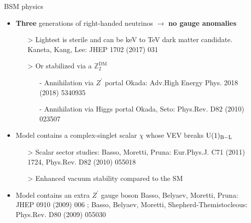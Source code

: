 \documentclass[10pt,xcolor=dvipsnames,mathserif]{beamer}
\begin{document}
\begin{frame}{BSM physics}
	
	\begin{itemize}
		\item \textbf{Three} generations of right-handed neutrinos $\to$ \textbf{\red no gauge anomalies}
		\begin{itemize}
			\item[>] Lightest is sterile and can be keV to TeV dark matter candidate. \\ {\blue \scriptsize  Kaneta, Kang, Lee: JHEP 1702 (2017) 031}
			\item[>] Or stabilized via a $\mathbb{Z}_2^{\mathrm{DM}}$
			\begin{itemize}
				\item[-] Annihilation via $Z^\prime$ portal {\scriptsize \blue Okada: Adv.High Energy Phys. 2018 (2018) 5340935}
				\item[-] Annihilation via Higgs portal {\scriptsize  \blue Okada, Seto: Phys.Rev. D82 (2010) 023507}
			\end{itemize}
		\end{itemize}
		\vskip2mm
		\item Model contains a complex-singlet scalar $\chi$ whose VEV breaks $\mathrm{U}(1)_{\mathrm{B-L}}$
		\begin{itemize}
			\item[>] Scalar sector studies: {\scriptsize  \blue Basso, Moretti, Pruna: Eur.Phys.J. C71 (2011) 1724, Phys.Rev. D82 (2010) 055018}
			\vskip2mm
			\item[>] Enhanced vacuum stability compared to the SM
			
		\end{itemize}	
		\vskip2mm
		\item Model contains an extra $Z^\prime$ gauge boson {\scriptsize  \blue Basso, Belyaev, Moretti, Pruna: JHEP 0910 (2009) 006} ; {\scriptsize  \blue Basso, Belyaev, Moretti, Shepherd-Themistocleous: Phys.Rev. D80 (2009) 055030}
		
	\end{itemize}
	
	
	\end{frame}
\end{document}
